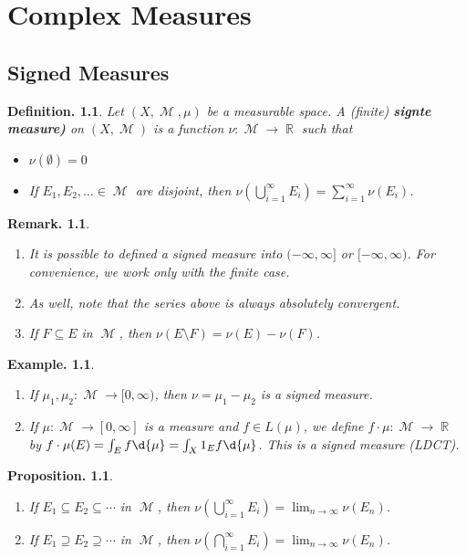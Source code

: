 \documentclass[11pt, a4paper]{memoir}
\DeclareMathOperator{\R}{{\mathbb{R}}}
\theoremstyle{change}
\newtheorem{proposition}[theorem]{Proposition.}
\theoremstyle{plain}
\theoremstyle{nonumberplain}
\newtheorem{definition}{Definition.}
\newtheorem{example}{Example.}
\newtheorem{remark}{Remark.}
\DeclareMathOperator{\M}{{\mathcal{M}}}
\begin{document}
\chapter{Complex Measures}
\section{Signed Measures}
\begin{definition}
    Let $(X,\M,\mu)$ be a measurable space.
    A (finite) \textbf{signte measure)} on $(X,\M)$ is a function $\nu:\M\to\R$ such that
    \begin{itemize}[nolistsep]
        \item $\nu(\emptyset)=0$
        \item If $E_1,E_2,\ldots\in\M$ are disjoint, then $\nu\left(\bigcup_{i=1}^\infty E_i\right)=\sum_{i=1}^\infty\nu(E_i)$.
    \end{itemize}
\end{definition}
\begin{remark}
    \begin{enumerate}[nolistsep]
        \item It is possible to defined a signed measure into $(-\infty,\infty]$ or $[-\infty,\infty)$. %
            For convenience, we work only with the finite case.
        \item As well, note that the series above is always absolutely convergent.
        \item If $F\subseteq E$ in $\M$, then $\nu(E\setminus F)=\nu(E)-\nu(F)$.
    \end{enumerate}
\end{remark}
\begin{example}
    \begin{enumerate}[nolistsep]
        \item If $\mu_1,\mu_2:\M\to[0,\infty)$, then $\nu=\mu_1-\mu_2$ is a signed measure. %
        \item If $\mu:\M\to[0,\infty]$ is a measure and $f\in L(\mu)$, we define $f\cdot\mu:\M\to\R$ by $f\cdot\mu(E)=\int_E f\d{\mu}=\int_X 1_E f\d{\mu}$.
            This is a signed measure (LDCT).
    \end{enumerate}
\end{example}
\begin{proposition}
    \begin{enumerate}[nolistsep,label=(\roman*)]
        \item If $E_1\subseteq E_2\subseteq\cdots$ in $\M$, then $\nu\left(\bigcup_{i=1}^\infty E_i\right)=\lim_{n\to\infty}\nu(E_n)$.
        \item If $E_1\supseteq E_2\supseteq\cdots$ in $\M$, then $\nu\left(\bigcap_{i=1}^\infty E_i\right)=\lim_{n\to\infty}\nu(E_n)$.
    \end{enumerate}
\end{proposition}
\end{document}
